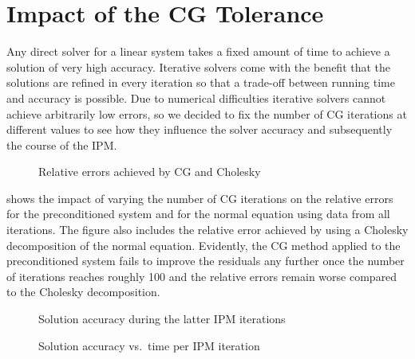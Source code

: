 \section{Impact of the CG Tolerance}\label{sec:experiment-cg-tolerance}

Any direct solver for a linear system takes a fixed amount of time to achieve a solution of very high accuracy.
Iterative solvers come with the benefit that the solutions are refined in every iteration so that a trade-off between running time and accuracy is possible.
Due to numerical difficulties iterative solvers cannot achieve arbitrarily low errors, so we decided to fix the number of CG iterations at different values to see how they influence the solver accuracy and subsequently the course of the IPM\@.

\begin{figure}[tbp]
  \centering%
  \caption{Relative errors achieved by CG and Cholesky}%
  \label{fig:residual_norms}
\end{figure}

 shows the impact of varying the number of CG iterations on the relative errors for the preconditioned system and for the normal equation using data from all iterations.
The figure also includes the relative error achieved by using a Cholesky decomposition of the normal equation.
Evidently, the CG method applied to the preconditioned system fails to improve the residuals any further once the number of iterations reaches roughly 100 and the relative errors remain worse compared to the Cholesky decomposition.

\begin{figure}[tbp]
  \centering%
  \caption{Solution accuracy during the latter IPM iterations}%
  \label{fig:accuracy_history}
\end{figure}

\begin{figure}[tbp]
  \centering%
  \caption{Solution accuracy vs.\ time per IPM iteration}%
  \label{fig:accuracy_vs_time}
\end{figure}


